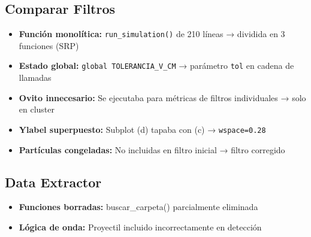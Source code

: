 \documentclass[12pt,a4paper]{article}
\begin{document}
\subsection*{Comparar Filtros}
\begin{itemize}[leftmargin=*]
	\item \textbf{Función monolítica:} \texttt{run\_simulation()} de 210 líneas → dividida en 3 funciones (SRP)
	\item \textbf{Estado global:} \texttt{global TOLERANCIA\_V\_CM} → parámetro \texttt{tol} en cadena de llamadas
	\item \textbf{Ovito innecesario:} Se ejecutaba para métricas de filtros individuales → solo en cluster
	\item \textbf{Ylabel superpuesto:} Subplot (d) tapaba con (c) → \texttt{wspace=0.28}
	\item \textbf{Partículas congeladas:} No incluidas en filtro inicial → filtro corregido
\end{itemize}

\subsection*{Data Extractor}
\begin{itemize}[leftmargin=*]
	\item \textbf{Funciones borradas:} buscar\_carpeta() parcialmente eliminada
	\item \textbf{Lógica de onda:} Proyectil incluido incorrectamente en detección
\end{itemize}
\end{document}
